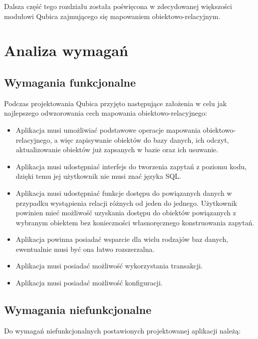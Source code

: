 \documentclass[12pt]{report}
\begin{document}
Dalsza część tego rozdziału została poświęcona w zdecydowanej większości modułowi Qubica zajmującego się mapowaniem obiektowo-relacyjnym.

\section{Analiza wymagań}

\subsection{Wymagania funkcjonalne}

Podczas projektowania Qubica przyjęto następujące założenia w celu jak najlepszego odwzorowania cech mapowania obiektowo-relacyjnego:

\begin{itemize}
\item Aplikacja musi umożliwiać podstawowe operacje mapowania obiektowo-rela\-cyjnego, a więc zapisywanie obiektów do bazy danych, ich odczyt, aktualizowanie obiektów
już zapsanych w bazie oraz ich usuwanie.
\item Aplikacja musi udostępniać interfejs do tworzenia zapytań z poziomu kodu, dzięki temu jej użytkownik nie musi znać języka SQL.
\item Aplikacja musi udostępniać funkcje dostępu do powiązanych danych w przypadku wystąpienia relacji różnych od jeden do jednego. Użytkownik powinien mieć możliwość
uzyskania dostępu do obiektów powiązanych z wybranym obiektem bez konieczności własnoręcznego konstruowania zapytań.
\item Aplikacja powinna posiadać wsparcie dla wielu rodzajów baz danych, ewentualnie musi być ona łatwo rozszerzalna.
\item Aplikacja musi posiadać możliwość wykorzystania transakcji.
\item Aplikacja musi posiadać możliwość konfiguracji.
\end{itemize}

\subsection{Wymagania niefunkcjonalne}

Do wymagań niefunkcjonalnych postawionych projektowanej aplikacji należą:
\end{document}
